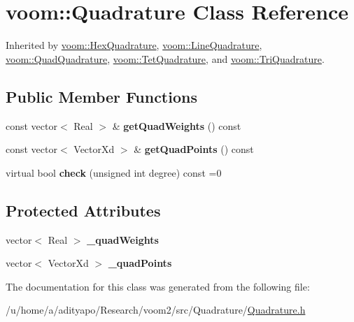 \hypertarget{classvoom_1_1_quadrature}{
\section{voom::Quadrature Class Reference}
\label{classvoom_1_1_quadrature}
}


Inherited by \hyperlink{classvoom_1_1_hex_quadrature}{voom::HexQuadrature}, \hyperlink{classvoom_1_1_line_quadrature}{voom::LineQuadrature}, \hyperlink{classvoom_1_1_quad_quadrature}{voom::QuadQuadrature}, \hyperlink{classvoom_1_1_tet_quadrature}{voom::TetQuadrature}, and \hyperlink{classvoom_1_1_tri_quadrature}{voom::TriQuadrature}.\subsection*{Public Member Functions}
\begin{DoxyCompactItemize}
\item 
\hypertarget{classvoom_1_1_quadrature_a1aea9ddcd4f82b9b81d639ec111ba2ed}{
const vector$<$ Real $>$ \& {\bfseries getQuadWeights} () const }
\label{classvoom_1_1_quadrature_a1aea9ddcd4f82b9b81d639ec111ba2ed}

\item 
\hypertarget{classvoom_1_1_quadrature_a18a2ce35f8a3786a77259b7b7b589ef1}{
const vector$<$ VectorXd $>$ \& {\bfseries getQuadPoints} () const }
\label{classvoom_1_1_quadrature_a18a2ce35f8a3786a77259b7b7b589ef1}

\item 
\hypertarget{classvoom_1_1_quadrature_aca75eb4424793a057c6d27ca5194e3f0}{
virtual bool {\bfseries check} (unsigned int degree) const =0}
\label{classvoom_1_1_quadrature_aca75eb4424793a057c6d27ca5194e3f0}

\end{DoxyCompactItemize}
\subsection*{Protected Attributes}
\begin{DoxyCompactItemize}
\item 
\hypertarget{classvoom_1_1_quadrature_a1a022a3ab7fef537b0ede65787554602}{
vector$<$ Real $>$ {\bfseries \_\-quadWeights}}
\label{classvoom_1_1_quadrature_a1a022a3ab7fef537b0ede65787554602}

\item 
\hypertarget{classvoom_1_1_quadrature_a033763f1240f04e2fbe1b7272aa45c6c}{
vector$<$ VectorXd $>$ {\bfseries \_\-quadPoints}}
\label{classvoom_1_1_quadrature_a033763f1240f04e2fbe1b7272aa45c6c}

\end{DoxyCompactItemize}


The documentation for this class was generated from the following file:\begin{DoxyCompactItemize}
\item 
/u/home/a/adityapo/Research/voom2/src/Quadrature/\hyperlink{_quadrature_8h}{Quadrature.h}\end{DoxyCompactItemize}
